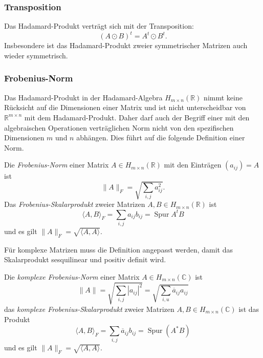 \subsubsection{Transposition}
Das Hadamard-Produkt verträgt sich mit der Transposition:
%
\[
(A\odot B)^t = A^t \odot B^t.
\]
Insbesondere ist das Hadamard-Produkt zweier symmetrischer Matrizen auch 
wieder symmetrisch.

\subsubsection{Frobenius-Norm}
Das Hadamard-Produkt in der Hadamard-Algebra $H_{m\times n}(\mathbb{R})$
nimmt keine Rücksicht auf die Dimensionen einer Matrix und ist nicht
unterscheidbar von $\mathbb{R}^{m\times n}$ mit dem Hadamard-Produkt.
Daher darf auch der Begriff einer mit den algebraischen Operationen
verträglichen Norm nicht von den spezifischen Dimensionen $m$ und $n$ abhängen.
Dies führt auf die folgende Definition einer Norm.

\begin{definition}
Die {\em Frobenius-Norm} einer Matrix $A\in H_{m\times n}(\mathbb{R})$
%
mit den Einträgen $(a_{i\!j})=A$ ist
\[
\| A\|_F
=
\sqrt{
\sum_{i,j} a_{i\!j}^2
}.
\]
Das {\em Frobenius-Skalarprodukt} zweier Matrizen
$A,B\in H_{m\times n}(\mathbb{R})$
ist
\[
\langle A,B\rangle_F
=
\sum_{i,j} a_{i\!j} b_{i\!j}
=
\operatorname{Spur} A^t B
\]
und es gilt $\|A\|_F = \sqrt{\langle A,A\rangle}$.
\end{definition}

Für komplexe Matrizen muss die Definition angepasst werden, damit 
das Skalarprodukt sesquilinear und positiv definit wird.

\begin{definition}
Die {\em komplexe Frobenius-Norm} einer Matrix $A\in H_{m\times n}(\mathbb{C})$
ist
\[
\| A\|
=
\sqrt{
\sum_{i,j} |a_{i\!j}|^2
}
=
\sqrt{
\sum_{i,u} \overline{a}_{i\!j} a_{i\!j}
}
\]
das {\em komplexe Frobenius-Skalarprodukt} zweier Matrizen
$A,B\in H_{m\times n}(\mathbb{C})$ ist das Produkt
\[
\langle A,B\rangle_F
=
\sum_{i,j}\overline{a}_{i\!j} b_{i\!j}
=
\operatorname{Spur} (A^* B)
\]
und es gilt $\|A\|_F = \sqrt{\langle A,A\rangle}$.
\end{definition}

